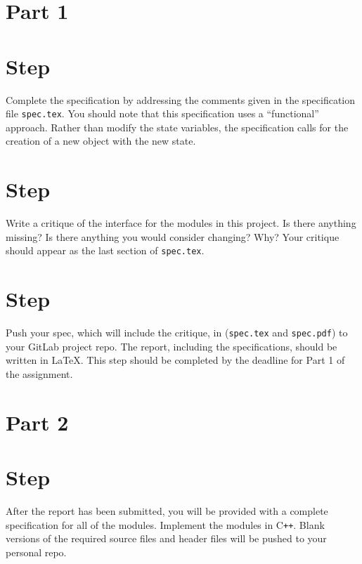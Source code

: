 \documentclass[12pt]{article}
\newcounter{stepnum}
\newcommand\CC{C\texttt{++}}
\begin{document}
\section*{Part 1}

\section *{Step  \thestepnum}

Complete the specification by addressing the comments given in the specification
file \texttt{spec.tex}.  You should note that this specification uses a
``functional'' approach.  Rather than modify the state variables, the
specification calls for the creation of a new object with the new state.

\section *{Step  \thestepnum}

Write a critique of the interface for the modules in this project.  Is there
anything missing?  Is there anything you would consider changing?  Why?  Your
critique should appear as the last section of \texttt{spec.tex}.

\section *{Step  \thestepnum}

Push your spec, which will include the critique, in (\texttt{spec.tex} and
\texttt{spec.pdf}) to your GitLab project repo.  The report, including the
specifications, should be written in \LaTeX.  This step should be completed by
the deadline for Part 1 of the assignment.

\section*{Part 2}

\section *{Step  \thestepnum}

After the report has been submitted, you will be provided with a complete
specification for all of the modules.  Implement the modules in \CC{}.  Blank
versions of the required source files and header files will be pushed to your
personal repo.
\end{document}
